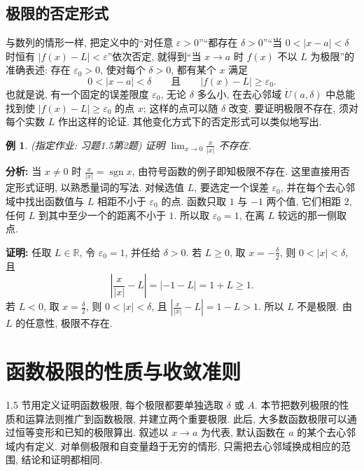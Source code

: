 \documentclass[UTF8,openany]{ctexbook}
\theoremstyle{chinesetextbook}
\newtheorem{example}{例}[section]
\newenvironment{cnproof}{\par\indent\textbf{证明:} \ignorespaces}{\par}
\begin{document}
\subsection{极限的否定形式}
与数列的情形一样, 把定义中的“对任意 $\varepsilon>0$”“都存在 $\delta>0$”“当 $0<|x-a|<\delta$ 时恒有 $|f(x)-L|<\varepsilon$”依次否定, 就得到“当 $x\to a$ 时 $f(x)$ 不以 $L$ 为极限”的准确表述: 存在 $\varepsilon_0>0$, 使对每个 $\delta>0$, 都有某个 $x$ 满足
\[
0<|x-a|<\delta\qquad\text{且}\qquad|f(x)-L|\ge\varepsilon_0.
\]
也就是说, 有一个固定的误差限度 $\varepsilon_0$, 无论 $\delta$ 多么小, 在去心邻域 $\mathring U(a,\delta)$ 中总能找到使 $|f(x)-L|\ge\varepsilon_0$ 的点 $x$; 这样的点可以随 $\delta$ 改变. 要证明极限不存在, 须对每个实数 $L$ 作出这样的论证. 其他变化方式下的否定形式可以类似地写出.
\begin{example}
\textnormal{(指定作业: 习题1.5第2题)} 证明 $\displaystyle\lim_{x\to0}\frac x{|x|}$ 不存在.
\end{example}
\par\indent\textbf{分析:} 当 $x\ne0$ 时 $\displaystyle\frac x{|x|}=\operatorname{sgn}x$, 由符号函数的例子即知极限不存在. 这里直接用否定形式证明, 以熟悉量词的写法. 对候选值 $L$, 要选定一个误差 $\varepsilon_0$, 并在每个去心邻域中找出函数值与 $L$ 相距不小于 $\varepsilon_0$ 的点. 函数只取 $1$ 与 $-1$ 两个值, 它们相距 $2$, 任何 $L$ 到其中至少一个的距离不小于 $1$. 所以取 $\varepsilon_0=1$, 在离 $L$ 较远的那一侧取点.
\begin{cnproof}
任取 $L\in\mathbb R$, 令 $\varepsilon_0=1$, 并任给 $\delta>0$. 若 $L\ge0$, 取 $\displaystyle x=-\frac\delta2$, 则 $0<|x|<\delta$, 且
\[
\left|\frac x{|x|}-L\right|=|-1-L|=1+L\ge1.
\]
若 $L<0$, 取 $\displaystyle x=\frac\delta2$, 则 $0<|x|<\delta$, 且 $\displaystyle\left|\frac x{|x|}-L\right|=1-L>1$. 所以 $L$ 不是极限. 由 $L$ 的任意性, 极限不存在.
\end{cnproof}
\section{函数极限的性质与收敛准则}
1.5 节用定义证明函数极限, 每个极限都要单独选取 $\delta$ 或 $A$. 本节把数列极限的性质和运算法则推广到函数极限, 并建立两个重要极限. 此后, 大多数函数极限可以通过恒等变形和已知的极限算出. 叙述以 $x\to a$ 为代表, 默认函数在 $a$ 的某个去心邻域内有定义. 对单侧极限和自变量趋于无穷的情形, 只需把去心邻域换成相应的范围, 结论和证明都相同.
\end{document}
